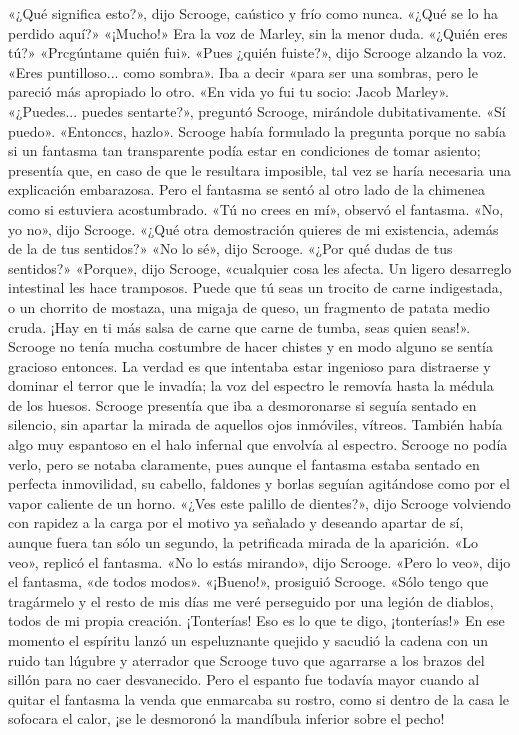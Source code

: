 \documentclass{novela}
\begin{document}
 «¿Qué significa esto?», dijo Scrooge, caústico y frío como nunca. «¿Qué se lo ha perdido aquí?»
 «¡Mucho!» Era la voz de Marley, sin la menor duda.
 «¿Quién eres tú?»
 «Prcgúntame quién fui».
 «Pues ¿quién fuiste?», dijo Scrooge alzando la voz. «Eres puntilloso... como sombra». Iba a decir «para ser una sombras, pero le pareció más apropiado lo otro.
 «En vida yo fui tu socio: Jacob Marley».
 «¿Puedes... puedes sentarte?», preguntó Scrooge, mirándole dubitativamente.
 «Sí puedo».
 «Entonccs, hazlo».
 Scrooge había formulado la pregunta porque no sabía si un fantasma tan transparente podía estar en condiciones de tomar asiento; presentía que, en caso de que le resultara imposible, tal vez se haría necesaria una explicación embarazosa. Pero el fantasma se sentó al otro lado de la chimenea como si estuviera acostumbrado.
 «Tú no crees en mí», observó el fantasma.
 «No, yo no», dijo Scrooge.
 «¿Qué otra demostración quieres de mi existencia, además de la de tus sentidos?»
 «No lo sé», dijo Scrooge.
 «¿Por qué dudas de tus sentidos?»
 «Porque», dijo Scrooge, «cualquier cosa les afecta. Un ligero desarreglo intestinal les hace tramposos. Puede que tú seas un trocito de carne indigestada, o un chorrito de mostaza, una migaja de queso, un fragmento de patata medio cruda. ¡Hay en ti más salsa de carne que carne de tumba, seas quien seas!».
 Scrooge no tenía mucha costumbre de hacer chistes y en modo alguno se sentía gracioso entonces. La verdad es que intentaba estar ingenioso para distraerse y dominar el terror que le invadía; la voz del espectro le removía hasta la médula de los huesos.
 Scrooge presentía que iba a desmoronarse si seguía sentado en silencio, sin apartar la mirada de aquellos ojos inmóviles, vítreos. También había algo muy espantoso en el halo infernal que envolvía al espectro. Scrooge no podía verlo, pero se notaba claramente, pues aunque el fantasma estaba sentado en perfecta inmovilidad, su cabello, faldones y borlas seguían agitándose como por el vapor caliente de un horno.
 «¿Ves este palillo de dientes?», dijo Scrooge volviendo con rapidez a la carga por el motivo ya señalado y deseando apartar de sí, aunque fuera tan sólo un segundo, la petrificada mirada de la aparición.
 «Lo veo», replicó el fantasma.
 «No lo estás mirando», dijo Scrooge.
 «Pero lo veo», dijo el fantasma, «de todos modos».
 «¡Bueno!», prosiguió Scrooge. «Sólo tengo que tragármelo y el resto de mis días me veré perseguido por una legión de diablos, todos de mi propia creación. ¡Tonterías! Eso es lo que te digo, ¡tonterías!»
 En ese momento el espíritu lanzó un espeluznante quejido y sacudió la cadena con un ruido tan lúgubre y aterrador que Scrooge tuvo que agarrarse a los brazos del sillón para no caer desvanecido. Pero el espanto fue todavía mayor cuando al quitar el fantasma la venda que enmarcaba su rostro, como si dentro de la casa le sofocara el calor, ¡se le desmoronó la mandíbula inferior sobre el pecho!
\end{document}
